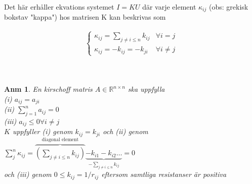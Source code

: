 \documentclass{assignment}
\newtheorem{anm}{Anm}
\begin{document}
Det här erhåller ekvations systemet $I = KU$
där varje element $\kappa_{ij}$ (obs: grekisk bokstav "kappa") hos matrisen K kan beskrivas som

\begin{align}
    \left\{\begin{matrix} \label{An1}
        \kappa_{ij} = \sum_{j\neq i \leq n}k_{ij} & \forall i=j
        \\ \kappa_{ij} = -k_{ij} = -k_{ji} & \forall i\neq j
    \end{matrix}\right.
\end{align}
\\ \\
\begin{anm} \label{properties}
    En kirschoff matris $A\in \mathbb{R}^{n \times n}$ ska uppfylla
    \\ (i) $a_{ij}=a_{ji}$
    \\ (ii) $ \sum_{j=1}^n a_{ij} = 0$
    \\  (iii) $ a_{ij}\leq 0 \forall i\neq j$
    \\ $K$ uppfyller (i) genom $k_{ij} = k_{ji}$ och (ii) genom $\sum_{j}^n \kappa_{ij} = \overbrace{(\sum_{j\neq i \leq n}k_{ij})}^{\text{diagonal element}} \underbrace{-k_{i1}-k_{i2}\dots}_{-\sum_{j\neq i \leq n}k_{ij}} = 0$   
    \\ och (iii) genom $0 \leq k_{ij} = 1/r_{ij}$ eftersom samtliga resistanser är positiva
\end{anm}
\end{document}
